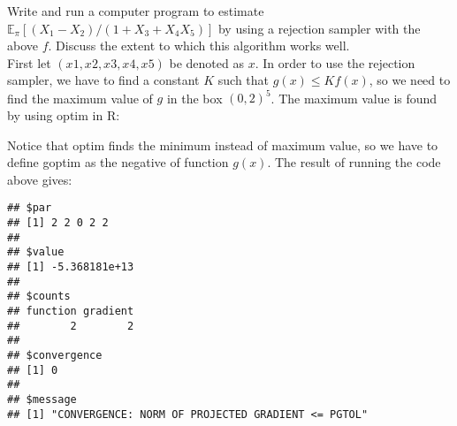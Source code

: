 
Write and run a computer program to estimate $\mathbb{E}_\pi[(X_1-X_2)/(1+X_3+X_4X_5)]$ by using a rejection sampler with the above $f$. Discuss the extent to which this algorithm works well.\\

First let $(x1,x2,x3,x4,x5)$ be denoted as $x$. In order to use the rejection sampler, we have to find a constant $K$ such that $g(x)\le Kf(x)$, so we need to find the maximum value of $g$ in the box $(0,2)^5$. The maximum value is found by using \textsf{optim} in R:
\begin{knitrout}
\color{fgcolor}\begin{kframe}
\begin{alltt}
 \hlkwb{=} \hlstd{(}\hlstd{) \{}
  \hlkwb{=}\hlstd{x[}\hlstd{]}
  \hlkwb{=}\hlstd{x[}\hlstd{]}
  \hlkwb{=}\hlstd{x[}\hlstd{]}
  \hlkwb{=}\hlstd{x[}\hlstd{]}
  \hlkwb{=}\hlstd{x[}\hlstd{]}
  \hlopt{-}\hlopt{+}\hlopt{+}\hlstd{)}\hlopt{^}\hlopt{+}\hlstd{)}\hlopt{*}\hlstd{(}\hlopt{+}\hlopt{+}\hlstd{)}\hlopt{*}\hlopt{*}\hlstd{(}\hlstd{((}\hlopt{-}\hlopt{*}\hlopt{*}\hlopt{-}\hlopt{*}\hlopt{^}\hlopt{+}\hlstd{)}
\hlstd{\}}
\hlstd{(}\hlstd{(}\hlstd{,}\hlstd{,}\hlstd{=}\hlstd{,}\hlstd{=}\hlstd{(}\hlstd{,}\hlstd{),}\hlstd{=}\hlstd{(}\hlstd{,}\hlstd{))}
\end{alltt}
\end{kframe}
\end{knitrout}
Notice that \textsf{optim} finds the minimum instead of maximum value, so we have to define \textsf{goptim} as the negative of function $g(x)$.
The result of running the code above gives:
\begin{knitrout}
\color{fgcolor}\begin{kframe}
\begin{verbatim}
## $par
## [1] 2 2 0 2 2
## 
## $value
## [1] -5.368181e+13
## 
## $counts
## function gradient 
##        2        2 
## 
## $convergence
## [1] 0
## 
## $message
## [1] "CONVERGENCE: NORM OF PROJECTED GRADIENT <= PGTOL"
\end{verbatim}
\end{kframe}
\end{knitrout}

